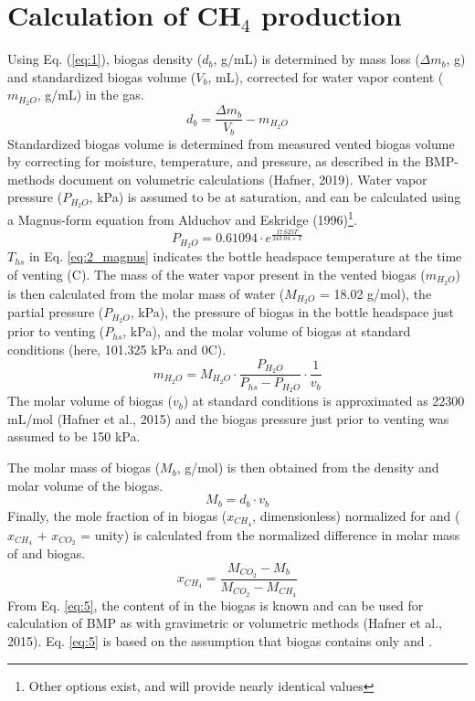 \documentclass[]{article}
\begin{document}
\section{Calculation of CH$_4$ production} \label{s_equations}
Using Eq. (\ref{eq:1}), biogas density ($d_b$, g/mL) is determined by mass loss ($\Delta m_b$, g) and standardized biogas volume ($V_b$, mL), corrected for water vapor content ($m_{H_2O}$, g/mL) in the gas. 
\begin{equation}
  \label{eq:1}
  d_b=\frac{\Delta m_b}{V_b}-m_{H_2O}
\end{equation}
Standardized biogas volume is determined from measured vented biogas volume by correcting for moisture, temperature, and pressure, as described in the BMP-methods document on volumetric calculations (Hafner, 2019).
Water vapor pressure ($P_{H_2O}$, kPa) is assumed to be at saturation, and can be calculated using a Magnus-form equation from Alduchov and Eskridge (1996)\footnote{
  Other options exist, and will provide nearly identical values}.
\begin{equation}
\label{eq:2_magnus}
   P_{H_2O} = 0.61094 \cdot e^{\frac{17.625 T}{243.04 + T}}
\end{equation}
$T_{hs}$ in Eq. \ref{eq:2_magnus} indicates the bottle headspace temperature at the time of venting (\degree C). 
The mass of the water vapor present in the vented biogas ($m_{H_2O}$) is then calculated from the molar mass of water ($M_{H_2O}$ = 18.02 g/mol), the partial pressure ($P_{H_2O}$, kPa), the pressure of biogas in the bottle headspace just prior to venting ($P_{hs}$, kPa), and the molar volume of biogas at standard conditions (here, 101.325 kPa and 0\degree C).
\begin{equation}
  \label{eq:3}
  m_{H_2O}=M_{H_2O} \cdot \frac{P_{H_2O}}{P_{hs}-P_{H_2O}} \cdot \frac{1}{v_b}
\end{equation}
The molar volume of biogas ($v_b$) at standard conditions is approximated as 22300 mL/mol (Hafner et al., 2015) and the biogas pressure just prior to venting was assumed to be 150 kPa.

The molar mass of biogas ($M_b$, g/mol) is then obtained from the density and molar volume of the biogas.
\begin{equation}
  \label{eq:4}
  M_b=d_b \cdot v_b
\end{equation}
Finally, the mole fraction of  in biogas ($x_{CH_4}$, dimensionless) normalized for  and  ($x_{CH_4}$ + $x_{CO_2}$ = unity) is calculated from the normalized difference in molar mass of  and biogas.
\begin{equation}
  \label{eq:5}
  x_{CH_4}=\frac{M_{CO_2}-M_b}{M_{CO_2}-M_{CH_4}}
\end{equation}
From Eq. \ref{eq:5}, the content of  in the biogas is known and can be used for calculation of BMP as with gravimetric or volumetric methods (Hafner et al., 2015). 
Eq. \ref{eq:5} is based on the assumption that biogas contains only  and .
\end{document}
